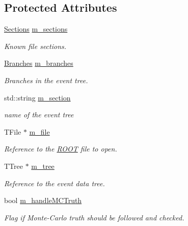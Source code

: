 \subsection*{Protected Attributes}
\begin{DoxyCompactItemize}
\item 
\hyperlink{class_d_d4hep_1_1_simulation_1_1_geant4_output2_r_o_o_t_a6bee4e4ece80aae4e2e07295486f8cd0}{Sections} \hyperlink{class_d_d4hep_1_1_simulation_1_1_geant4_output2_r_o_o_t_a43291c7d4f16e1f7eda8da9a16d6c4fa}{m\+\_\+sections}
\begin{DoxyCompactList}\small\item\em Known file sections. \end{DoxyCompactList}\item 
\hyperlink{class_d_d4hep_1_1_simulation_1_1_geant4_output2_r_o_o_t_a7c5890a17d3f70ce65703cdbec3cf53c}{Branches} \hyperlink{class_d_d4hep_1_1_simulation_1_1_geant4_output2_r_o_o_t_aaa47a8c6bcede196e832490b3a7c90bd}{m\+\_\+branches}
\begin{DoxyCompactList}\small\item\em Branches in the event tree. \end{DoxyCompactList}\item 
std\+::string \hyperlink{class_d_d4hep_1_1_simulation_1_1_geant4_output2_r_o_o_t_a27d44319d71af2cbb9304f94fce6a075}{m\+\_\+section}
\begin{DoxyCompactList}\small\item\em name of the event tree \end{DoxyCompactList}\item 
T\+File $\ast$ \hyperlink{class_d_d4hep_1_1_simulation_1_1_geant4_output2_r_o_o_t_aaaa94e6e9906bc1853e149bc82cfb2af}{m\+\_\+file}
\begin{DoxyCompactList}\small\item\em Reference to the \hyperlink{namespace_r_o_o_t}{R\+O\+OT} file to open. \end{DoxyCompactList}\item 
T\+Tree $\ast$ \hyperlink{class_d_d4hep_1_1_simulation_1_1_geant4_output2_r_o_o_t_abebdae30096c1b1a5ff1f7da427db295}{m\+\_\+tree}
\begin{DoxyCompactList}\small\item\em Reference to the event data tree. \end{DoxyCompactList}\item 
bool \hyperlink{class_d_d4hep_1_1_simulation_1_1_geant4_output2_r_o_o_t_a3c70e98cb0a96de60a51443482a88c9f}{m\+\_\+handle\+M\+C\+Truth}
\begin{DoxyCompactList}\small\item\em Flag if Monte-\/\+Carlo truth should be followed and checked. \end{DoxyCompactList}\end{DoxyCompactItemize}
